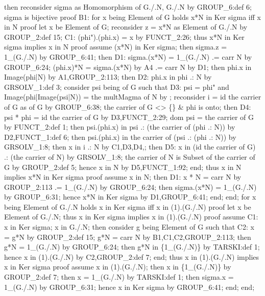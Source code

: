   then reconsider sigma as Homomorphism of G./.N, G./.N by GROUP_6:def 6;
  sigma is bijective
  proof
    B1: for x being Element of G holds x*N in Ker sigma iff x in N
    proof
      let x be Element of G;
      reconsider z = x*N as Element of G./.N by GROUP_2:def 15;
      C1: (phi").(phi.x) = x by FUNCT_2:26;
      thus x*N in Ker sigma implies x in N
      proof
        assume (x*N) in Ker sigma;
        then sigma.z = 1_(G./.N) by GROUP_6:41;
        then D1: sigma.(x*N) = 1_(G./.N)
                            .= carr N by GROUP_6:24;
        (phi.x)*N = sigma.(x*N) by A4
                 .= carr N by D1;
        then phi.x in Image(phi|N) by A1,GROUP_2:113;
        then D2: phi.x in phi .: N by GRSOLV_1:def 3;
        consider psi being  of G such that
        D3: psi = phi" and
            Image(phi|Image(psi|N)) = the multMagma of N
        by ;
        reconsider i = id the carrier of G as  of G by GROUP_6:38;
        the carrier of G <> \{\} & phi is onto;
        then D4: psi * phi = id the carrier of G by D3,FUNCT_2:29;
        dom psi = the carrier of G by FUNCT_2:def 1;
        then psi.(phi.x) in psi .: (the carrier of (phi .: N))
        by D2,FUNCT_1:def 6;
        then psi.(phi.x) in the carrier of (psi .: (phi .: N)) by GRSOLV_1:8;
        then x in i .: N by C1,D3,D4,;
        then D5: x in (id the carrier of G) .: (the carrier of N) by GRSOLV_1:8;
        the carrier of N is Subset of the carrier of G by GROUP_2:def 5;
        hence x in N by D5,FUNCT_1:92;
      end;
      thus x in N implies x*N in Ker sigma
      proof
        assume x in N;
        then D1: x * N = carr N by GROUP_2:113
                      .= 1_(G./.N) by GROUP_6:24;
        then sigma.(x*N) = 1_(G./.N) by GROUP_6:31;
        hence x*N in Ker sigma by D1,GROUP_6:41;
      end;
    end;
    for x being Element of G./.N holds x in Ker sigma iff x in (1).(G./.N)
    proof
      let x be Element of G./.N;
      thus x in Ker sigma implies x in (1).(G./.N)
      proof
        assume C1: x in Ker sigma;
        x in G./.N;
        then consider g being Element of G such that
        C2: x = g*N by GROUP_2:def 15;
        g*N = carr N by B1,C1,C2,GROUP_2:113;
        then g*N = 1_(G./.N) by GROUP_6:24;
        then g*N in \{1_(G./.N)\} by TARSKI:def 1;
        hence x in (1).(G./.N) by C2,GROUP_2:def 7;
      end;
      thus x in (1).(G./.N) implies x in Ker sigma
      proof
        assume x in (1).(G./.N);
        then x in \{1_(G./.N)\} by GROUP_2:def 7;
        then x = 1_(G./.N) by TARSKI:def 1;
        then sigma.x = 1_(G./.N) by GROUP_6:31;
        hence x in Ker sigma by GROUP_6:41;
      end;
    end;

